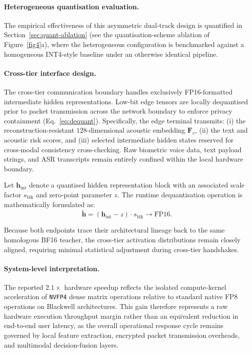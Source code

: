 \documentclass[a4paper,fleqn]{cas-sc}
\begin{document}
\paragraph{Heterogeneous quantisation evaluation.}
The empirical effectiveness of this asymmetric dual-track design is quantified in Section~\ref{sec:quant-ablation} (see the quantisation-scheme ablation of Figure~\ref{fig4}a), where the heterogeneous configuration is benchmarked against a homogeneous INT4-style baseline under an otherwise identical pipeline.

\paragraph{Cross-tier interface design.}
The cross-tier communication boundary handles exclusively FP16-formatted intermediate hidden representations. Low-bit edge tensors are locally dequantised prior to packet transmission across the network boundary to enforce privacy containment (Eq.~\ref{eq:dequant}). Specifically, the edge terminal transmits: (i) the reconstruction-resistant $128\text{-dimensional}$ acoustic embedding $\bm{F}_v$, (ii) the text and acoustic risk scores, and (iii) selected intermediate hidden states reserved for cross-modal consistency cross-checking. Raw biometric voice data, text payload strings, and ASR transcripts remain entirely confined within the local hardware boundary.

Let $\bm{h}_{\mathrm{int}}$ denote a quantised hidden representation block with an associated scale factor $s_{\mathrm{blk}}$ and zero-point parameter $z$. The runtime dequantisation operation is mathematically formulated as:
\begin{equation}
\label{eq:dequant}
\tilde{\bm{h}} = (\bm{h}_{\mathrm{int}} - z) \cdot s_{\mathrm{blk}} \to \text{FP16}.
\end{equation}

Because both endpoints trace their architectural lineage back to the same homologous BF16 teacher, the cross-tier activation distributions remain closely aligned, requiring minimal statistical adjustment during cross-tier handshakes.

\paragraph{System-level interpretation.}
The reported $2.1\times$ hardware speedup reflects the isolated compute-kernel acceleration of \texttt{NVFP4} dense matrix operations relative to standard native FP8 operations on Blackwell architectures. This gain therefore represents a raw hardware execution throughput margin rather than an equivalent reduction in end-to-end user latency, as the overall operational response cycle remains governed by local feature extraction, encrypted packet transmission overheads, and multimodal decision-fusion layers.
\end{document}
